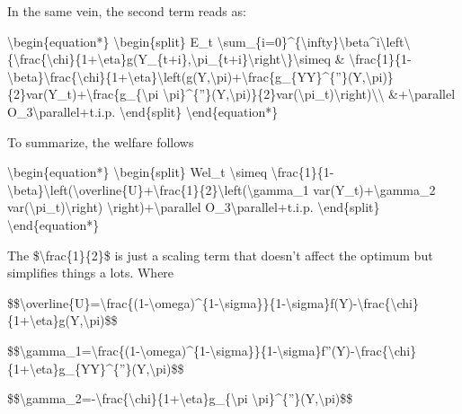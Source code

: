 \documentclass[10pt,math=newtx,citestyle=gb7714-2015,bibstyle=gb7714-2015]{elegantbook}
\begin{document}
	In the same vein, the second term reads as:
	
	\textbackslash{}begin\{equation*\}
	\textbackslash{}begin\{split\}
	E\_t \textbackslash{}sum\_\{i=0\}\^{}\{\textbackslash{}infty\}\textbackslash{}beta\^{}i\textbackslash{}left\textbackslash{}\{\textbackslash{}frac\{\textbackslash{}chi\}\{1+\textbackslash{}eta\}g(Y\_\{t+i\},\textbackslash{}pi\_\{t+i\}\textbackslash{}right\textbackslash{}\}\textbackslash{}simeq \& \textbackslash{}frac\{1\}\{1-\textbackslash{}beta\}\textbackslash{}frac\{\textbackslash{}chi\}\{1+\textbackslash{}eta\}\textbackslash{}left(g(Y,\textbackslash{}pi)+\textbackslash{}frac\{g\_\{YY\}\^{}\{''\}(Y,\textbackslash{}pi)\}\{2\}var(Y\_t)+\textbackslash{}frac\{g\_\{\textbackslash{}pi \textbackslash{}pi\}\^{}\{''\}(Y,\textbackslash{}pi)\}\{2\}var(\textbackslash{}pi\_t)\textbackslash{}right)\textbackslash{}\textbackslash{}
	\&+\textbackslash{}parallel O\_3\textbackslash{}parallel+t.i.p.
	\textbackslash{}end\{split\}
	\textbackslash{}end\{equation*\}
	
	To summarize, the welfare follows
	
	\textbackslash{}begin\{equation*\}
	\textbackslash{}begin\{split\}
	Wel\_t \textbackslash{}simeq  \textbackslash{}frac\{1\}\{1-\textbackslash{}beta\}\textbackslash{}left(\textbackslash{}overline\{U\}+\textbackslash{}frac\{1\}\{2\}\textbackslash{}left(\textbackslash{}gamma\_1 var(Y\_t)+\textbackslash{}gamma\_2 var(\textbackslash{}pi\_t)\textbackslash{}right) \textbackslash{}right)+\textbackslash{}parallel O\_3\textbackslash{}parallel+t.i.p.
	\textbackslash{}end\{split\}
	\textbackslash{}end\{equation*\}
	
	The \$\textbackslash{}frac\{1\}\{2\}\$ is just a scaling term that doesn't affect the optimum but simplifies things a lots. Where
	
	\$\$\textbackslash{}overline\{U\}=\textbackslash{}frac\{(1-\textbackslash{}omega)\^{}\{1-\textbackslash{}sigma\}\}\{1-\textbackslash{}sigma\}f(Y)-\textbackslash{}frac\{\textbackslash{}chi\}\{1+\textbackslash{}eta\}g(Y,\textbackslash{}pi)\$\$
	
	\$\$\textbackslash{}gamma\_1=\textbackslash{}frac\{(1-\textbackslash{}omega)\^{}\{1-\textbackslash{}sigma\}\}\{1-\textbackslash{}sigma\}f''(Y)-\textbackslash{}frac\{\textbackslash{}chi\}\{1+\textbackslash{}eta\}g\_\{YY\}\^{}\{''\}(Y,\textbackslash{}pi)\$\$
	
	\$\$\textbackslash{}gamma\_2=-\textbackslash{}frac\{\textbackslash{}chi\}\{1+\textbackslash{}eta\}g\_\{\textbackslash{}pi \textbackslash{}pi\}\^{}\{''\}(Y,\textbackslash{}pi)\$\$
	
\end{document}
